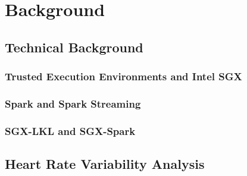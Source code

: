 \chapter{Background} \label{chap:background}

\section{Technical Background}

\subsection{Trusted Execution Environments and Intel SGX}

\subsection{Spark and Spark Streaming}

\subsection{SGX-LKL and SGX-Spark}

\section{Heart Rate Variability Analysis}


